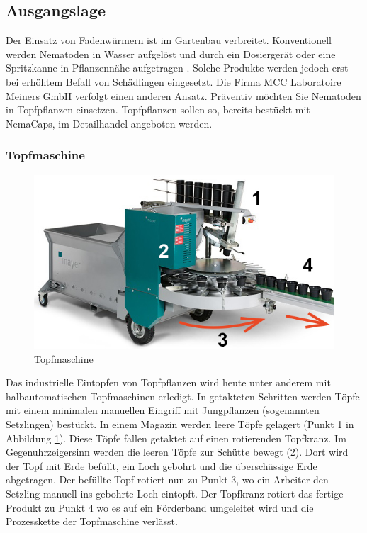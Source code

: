
\subsection{Ausgangslage}
Der Einsatz von Fadenwürmern ist im Gartenbau verbreitet. Konventionell werden Nematoden in Wasser aufgelöst und durch ein Dosiergerät oder eine Spritzkanne in Pflanzennähe aufgetragen \cite{birchmeier}. Solche Produkte werden jedoch erst bei erhöhtem Befall von Schädlingen eingesetzt. Die Firma MCC Laboratoire Meiners GmbH verfolgt einen anderen Ansatz. Präventiv möchten Sie Nematoden in Topfpflanzen einsetzen. Topfpflanzen sollen so, bereits bestückt mit NemaCaps, im Detailhandel angeboten werden. 
\subsubsection{Topfmaschine}
\begin{figure}
	\includegraphics[draft=false,scale=0.5]{Illustrationen/3-Einleitung/schema_topfmaschine.jpg}
	\caption{Topfmaschine \protect\cite{mayer}}
	\label{fig:schema_topfmaschine}
\end{figure}
Das industrielle Eintopfen von Topfpflanzen wird heute unter anderem mit halbautomatischen Topfmaschinen erledigt. In getakteten Schritten werden Töpfe mit einem minimalen manuellen Eingriff mit Jungpflanzen (sogenannten Setzlingen) bestückt. In einem Magazin werden leere Töpfe gelagert (Punkt 1 in Abbildung \ref{fig:schema_topfmaschine}). Diese Töpfe fallen getaktet auf einen rotierenden Topfkranz. Im Gegenuhrzeigersinn werden die leeren Töpfe zur Schütte bewegt (2). Dort wird der Topf mit Erde befüllt, ein Loch gebohrt und die überschüssige Erde abgetragen. Der befüllte Topf rotiert nun zu Punkt 3, wo ein Arbeiter den Setzling manuell ins gebohrte Loch eintopft. Der Topfkranz rotiert das fertige Produkt zu Punkt 4 wo es auf ein Förderband umgeleitet wird und die Prozesskette der Topfmaschine verlässt.

